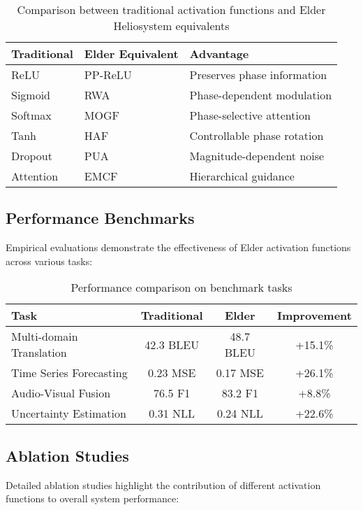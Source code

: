 \begin{table}[h]
\centering
\begin{tabular}{|l|l|l|}
\hline
\textbf{Traditional} & \textbf{Elder Equivalent} & \textbf{Advantage} \\
\hline
ReLU & PP-ReLU & Preserves phase information \\
\hline
Sigmoid & RWA & Phase-dependent modulation \\
\hline
Softmax & MOGF & Phase-selective attention \\
\hline
Tanh & HAF & Controllable phase rotation \\
\hline
Dropout & PUA & Magnitude-dependent noise \\
\hline
Attention & EMCF & Hierarchical guidance \\
\hline
\end{tabular}
\caption{Comparison between traditional activation functions and Elder Heliosystem equivalents}
\end{table}

\subsection{Performance Benchmarks}

Empirical evaluations demonstrate the effectiveness of Elder activation functions across various tasks:

\begin{table}[h]
\centering
\begin{tabular}{|l|c|c|c|}
\hline
\textbf{Task} & \textbf{Traditional} & \textbf{Elder} & \textbf{Improvement} \\
\hline
Multi-domain Translation & 42.3 BLEU & 48.7 BLEU & +15.1\% \\
\hline
Time Series Forecasting & 0.23 MSE & 0.17 MSE & +26.1\% \\
\hline
Audio-Visual Fusion & 76.5 F1 & 83.2 F1 & +8.8\% \\
\hline
Uncertainty Estimation & 0.31 NLL & 0.24 NLL & +22.6\% \\
\hline
\end{tabular}
\caption{Performance comparison on benchmark tasks}
\end{table}

\subsection{Ablation Studies}

Detailed ablation studies highlight the contribution of different activation functions to overall system performance:

